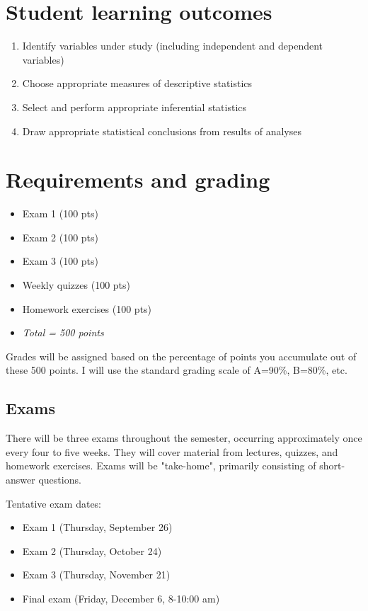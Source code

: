 \documentclass[10pt]{article}
\begin{document}
\section*{Student learning outcomes}
\label{sec:orgeaa3496}
\begin{enumerate}
\item Identify variables under study (including independent and dependent variables)
\item Choose appropriate measures of descriptive statistics
\item Select and perform appropriate inferential statistics
\item Draw appropriate statistical conclusions from results of analyses
\end{enumerate}

\section*{Requirements and grading}
\label{sec:orgbf71312}
\begin{itemize}
\item Exam 1 (100 pts)
\item Exam 2 (100 pts)
\item Exam 3 (100 pts)
\item Weekly quizzes (100 pts)
\item Homework exercises (100 pts)
\item \emph{Total = 500 points}
\end{itemize}

Grades will be assigned based on the percentage of points you accumulate out of these 500 points.  I will use the standard grading scale of A=90\%, B=80\%, etc.

\subsection*{Exams}
\label{sec:orgc564b32}
There will be three exams throughout the semester, occurring approximately once every four to five weeks.  They will cover material from lectures, quizzes, and homework exercises. Exams will be "take-home", primarily consisting of short-answer questions.

Tentative exam dates:

\begin{itemize}
\item Exam 1 (Thursday, September 26)
\item Exam 2 (Thursday, October 24)
\item Exam 3 (Thursday, November 21)
\item Final exam (Friday, December 6, 8-10:00 am)
\end{itemize}
\end{document}
